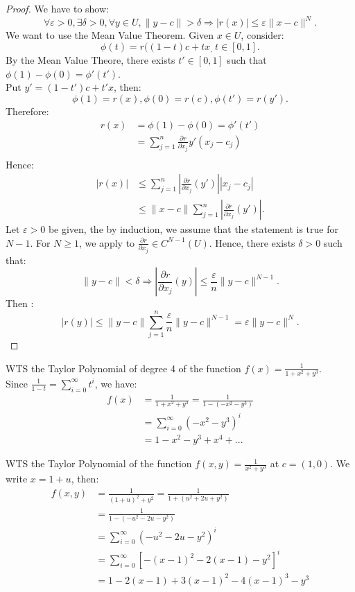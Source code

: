 \documentclass[11pt]{article}
\newenvironment{example}[1]{\begin{exbox}{#1}{}}{\end{exbox}}
\theoremstyle{quiet}
\theoremstyle{quietremark}
\begin{document}
\begin{proof}
We have to show:
\[
\forall \varepsilon>0, \exists \delta>0, \forall y\in U, \|y-c\|>\delta\Rightarrow |r(x)|\le\varepsilon\|x-c\|^N.
\]
We want to use the Mean Value Theorem. Given $x\in U$, consider:
\[
\phi(t)=r((1-t)c+tx_, ~t\in[0,1].
\]
By the Mean Value Theore, there exists $t'\in[0,1]$ such that $\phi(1)-\phi(0)=\phi'(t')$.\\
Put $y'=(1-t')c+t'x$, then:
\[
\phi(1)=r(x),\phi(0)=r(c),\phi(t')=r(y').
\]
Therefore:
\[
\begin{aligned}
r(x)&=\phi(1)-\phi(0)=\phi'(t')\\
&=\sum_{j=1}^n\frac{\partial r}{\partial x_j}y'(x_j-c_j)\\
\end{aligned}
\]
Hence:
\[
\begin{aligned}
|r(x)|&\le\sum_{j=1}^n\left|\frac{\partial r}{\partial x_j}(y')\right||x_j-c_j|\\
&\le \|x-c\|\sum_{j=1}^n\left|\frac{\partial r}{\partial x_j}(y')\right|.
\end{aligned}
\]
Let $\varepsilon>0$ be given, the by induction, we assume that the statement is true for $N-1$. For $N\ge 1$, we apply to $\displaystyle\frac{\partial r}{\partial x_j}\in C^{N-1}(U)$. Hence, there exists $\delta>0$ such that:
\[
\|y-c\|<\delta\Rightarrow\left|\frac{\partial r}{\partial x_j}(y)\right|\le\frac{\varepsilon}{n}\|y-c\|^{N-1}.
\]
Then :
\[
|r(y)|\le\|y-c\|\sum_{j=1}^n\frac{\varepsilon}{n}\|y-c\|^{N-1}=\varepsilon\|y-c\|^N.
\]
\end{proof}
\newpage
\begin{example}{}
WTS the Taylor Polynomial of degree 4 of the function $\displaystyle f(x)=\frac{1}{1+x^2+y^3}.$\\
Since $\frac{1}{1-t}=\sum_{i=0}^\infty t^i$, we have:
\[
\begin{aligned}
f(x)&=\frac{1}{1+x^2+y^3}=\frac{1}{1-(-x^2-y^3)}\\
&=\sum_{i=0}^\infty(-x^2-y^3)^i\\
&=1-x^2-y^3+x^4+...
\end{aligned}
\]
\end{example}

\begin{example}{}
WTS the Taylor Polynomial of the function $f(x,y)=\frac{1}{x^2+y^3}$ at $c=(1,0)$.
We write $x=1+u$, then:
\[
\begin{aligned}
f(x,y)&=\frac{1}{(1+u)^2+y^2}=\frac{1}{1+(u^2+2u+y^2)}\\
&=\frac{1}{1-(-u^2-2u-y^2)}\\
&=\sum_{i=0}^\infty (-u^2-2u-y^2)^i\\
&=\sum_{i=0}^\infty[-(x-1)^2-2(x-1)-y^2]^i\\
&=1-2(x-1)+3(x-1)^2-4(x-1)^3-y^3
\end{aligned}
\]
\end{example}
\end{document}

